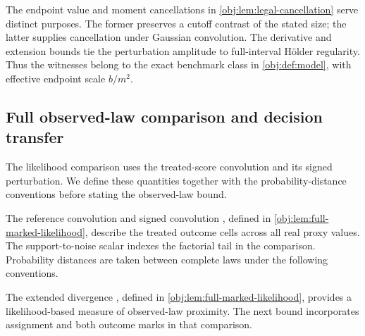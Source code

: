 The endpoint value and moment cancellations in \cref{obj:lem:legal-cancellation} serve distinct purposes. The former preserves a cutoff contrast of the stated size; the latter supplies cancellation under Gaussian convolution. The derivative and extension bounds tie the perturbation amplitude to full-interval Hölder regularity. Thus the witnesses belong to the exact benchmark class in \cref{obj:def:model}, with effective endpoint scale \(b/m^2\).

\subsection{Full observed-law comparison and decision transfer}

The likelihood comparison uses the treated-score convolution and its signed perturbation. We define these quantities together with the probability-distance conventions before stating the observed-law bound.



The reference convolution  and signed convolution , defined in \cref{obj:lem:full-marked-likelihood}, describe the treated outcome cells across all real proxy values. The support-to-noise scalar  indexes the factorial tail in the comparison. Probability distances are taken between complete laws under the following conventions.



The extended divergence , defined in \cref{obj:lem:full-marked-likelihood}, provides a likelihood-based measure of observed-law proximity. The next bound incorporates assignment and both outcome marks in that comparison.

